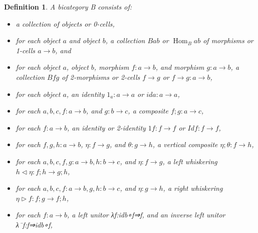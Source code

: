 \documentclass[11pt,noamsfonts]{amsart}
\newtheorem{definition}[thm]{Definition}
\DeclareMathOperator{\Hom}{Hom}
\begin{document}
\begin{definition}
A bicategory B consists of:
\begin{itemize}
\item a collection of objects or 0-cells,
\item for each object \(a\) and object \(b\), a collection \(B a b \) or \(\Hom_B a b\) of morphisms or 1-cells \(a \to b\), and
\item for each object \(a\), object \(b\), morphism \(f :  a \to b\), and morphism \(g : a \to b\), a collection \(B f g\) of 2-morphisms or 2-cells \(f \to g\) or \(f \to g : a \to b\),

\item for each object \(a\), an identity \(1_a : a \to a\) or \(id a : a \to a\),
\item for each \(a,b,c, f : a \to b\), and \(g : b \to c\), a composite \(f;g : a \to c\),
\item for each \(f : a \to b\), an identity or 2-identity \(1 f : f \to f\) or \(Id f : f \to f\),
\item for each \(f,g,h : a \to b \), \(\eta : f \to g\), and \( \theta : g \to h \), a vertical composite \(\eta ; \theta : f \to h \),
\item for each \(a,b,c, f,g : a \to b, h : b \to c\), and \( \eta : f \to g \), a left whiskering \( h \triangleleft \eta : f; h \to g; h \),
\item for each \(a,b,c, f:a \to b, g,h : b \to c\), and  \( \eta : g \to h\), a right whiskering \(\eta \triangleright f : f; g \to f; h \),
\item for each \(f : a \to b\), a left unitor λf:idb∘f⇒f, and an inverse left unitor λ¯f:f⇒idb∘f,


\end{itemize}
\end{definition}
\end{document}
